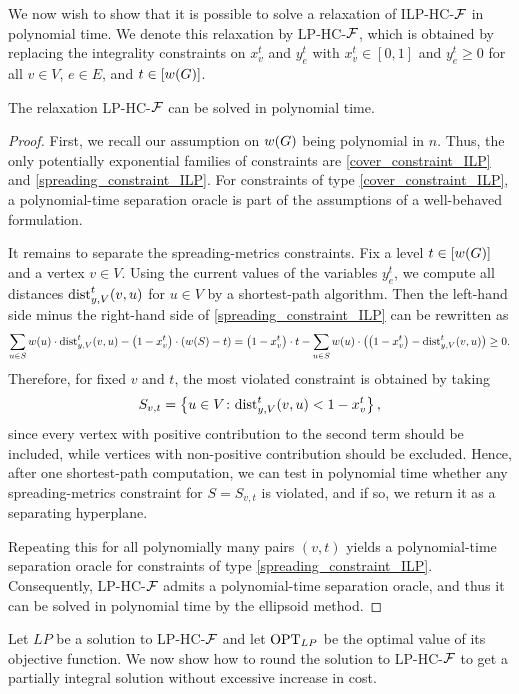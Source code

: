     We now wish to show that it is possible to solve a relaxation of \textsc{ILP-HC-$\mathcal{F}$} in polynomial time. We denote this relaxation by \textsc{LP-HC-$\mathcal{F}$}, which is obtained by replacing the integrality constraints on $x_v^t$ and $y_e^t$ with $x_v^t\in [0,1]$ and $y_e^t\geq 0$ for all $v\in V$, $e\in E$, and $t\in [w\mathopen{}\left( G \right)]$.
    \begin{lemma}\label{lem:lp-polytime}
        The relaxation \textsc{LP-HC-$\mathcal{F}$} can be solved in polynomial time.
    \end{lemma}
    \begin{proof}
        First, we recall our assumption on $w\mathopen{}\left( G \right)$ being polynomial in $n$.
        Thus, the only potentially exponential families of constraints are \eqref{cover_constraint_ILP} and \eqref{spreading_constraint_ILP}. For constraints of type \eqref{cover_constraint_ILP}, a polynomial-time separation oracle is part of the assumptions of a well-behaved formulation.

        It remains to separate the spreading-metrics constraints. Fix a level $t\in [w\mathopen{}\left( G \right)]$ and a vertex $v\in V$. Using the current values of the variables $y_e^t$, we compute all distances $\text{dist}_{y,V}^{t}(v,u)$ for $u\in V$ by a shortest-path algorithm. Then the left-hand side minus the right-hand side of \eqref{spreading_constraint_ILP} can be rewritten as
        \[
            \sum_{u\in S} w(u)\cdot \text{dist}_{y,V}^{t}(v,u) - \mathopen{}\left( 1-x_v^t \right)\cdot \mathopen{}\left( w\mathopen{}\left( S \right)-t \right)
            = \mathopen{}\left( 1-x_v^t \right)\cdot t - \sum_{u\in S} w(u)\cdot \mathopen{}\left( \mathopen{}\left( 1-x_v^t \right)-\text{dist}_{y,V}^{t}(v,u) \right)\geq 0.
        \]
        Therefore, for fixed $v$ and $t$, the most violated constraint is obtained by taking
        \[
            S_{v,t}=\mathopen{}\left\{ u\in V\colon \text{dist}_{y,V}^{t}(v,u)<1-x_v^t \right\},
        \]
        since every vertex with positive contribution to the second term should be included, while vertices with non-positive contribution should be excluded. Hence, after one shortest-path computation, we can test in polynomial time whether any spreading-metrics constraint for $S=S_{v,t}$ is violated, and if so, we return it as a separating hyperplane.

        Repeating this for all polynomially many pairs $(v,t)$ yields a polynomial-time separation oracle for constraints of type \eqref{spreading_constraint_ILP}. Consequently, \textsc{LP-HC-$\mathcal{F}$} admits a polynomial-time separation oracle, and thus it can be solved in polynomial time by the ellipsoid method.
    \end{proof}
    Let $LP$ be a solution to \textsc{LP-HC-$\mathcal{F}$} and let $\text{OPT}_{LP}$ be the optimal value of its objective function. We now show how to round the solution to \textsc{LP-HC-$\mathcal{F}$} to get a partially integral solution without excessive increase in cost.

